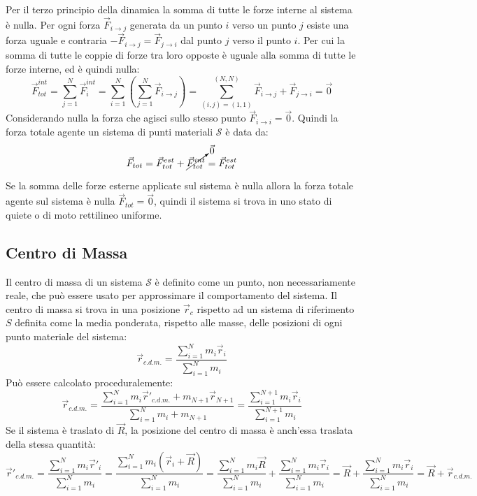 \documentclass{article}
\numberwithin{equation}{subsection}
\begin{document}
Per il terzo principio della dinamica 
la somma di tutte le forze interne al sistema è nulla. Per ogni 
forza $\vec{F}_{i\to j}$ generata da un punto $i$ verso un punto $j$ 
esiste una forza uguale e contraria $-\vec{F}_{i\to j}=\vec{F}_{j\to i}$ dal punto $j$ verso il punto $i$. 
Per cui la somma di tutte le coppie di forze tra loro opposte 
è uguale alla somma di tutte le forze interne, ed è quindi nulla:
\begin{equation}
    \vec{F}_{tot}^{int}=\displaystyle\sum_{j=1}^{N}\vec{F}_i^{int}=\sum_{i=1}^{N}\left(\sum_{j=1}^{N}\vec{F}_{i\to j}\right)=\sum_{(i,j)=(1,1)}^{(N,N)}\vec{F}_{i\to j}+\vec{F}_{j\to i}=\vec{0}
\end{equation}
Considerando nulla la forza che agisci sullo stesso punto $\vec{F}_{i\to i}=\vec{0}$.
Quindi la forza totale agente un sistema di punti materiali $\mathscr{S}$ è data da:
\begin{equation}
    \vec{F}_{tot}=\vec{F}^{est}_{tot}+\cancelto{\vec0}{\vec{F}^{int}_{tot}}=\vec{F}^{est}_{tot}
\end{equation}


Se la somma delle forze esterne applicate sul sistema 
è nulla allora la forza totale agente sul sistema è nulla $\vec{F}_{tot}=\vec{0}$, quindi il sistema 
si trova in uno stato di quiete o di moto rettilineo uniforme. 

\subsection{Centro di Massa}
Il centro di massa di un sistema $\mathscr{S}$ è definito come 
un punto, non necessariamente reale, che può essere usato per approssimare il comportamento del sistema. 
Il centro di massa si trova in una posizione $\vec{r}_c$ 
rispetto ad un sistema di riferimento $S$ definita come la media ponderata, rispetto alle masse, delle posizioni di ogni punto materiale del sistema: 
\begin{equation}
    \vec{r}_{c.d.m.}=\displaystyle\frac{\sum_{i=1}^{N}m_i\vec{r}_i}{\sum_{i=1}^{N}m_i}
\end{equation}
Può essere calcolato proceduralemente:
\begin{equation*}
    \vec{r}_{c.d.m.}=\displaystyle\frac{\sum_{i=1}^Nm_i\vec{r}'_{c.d.m.}+m_{N+1}\vec{r}_{N+1}}{\sum_{i=1}^Nm_i+m_{N+1}}=\frac{\sum_{i=1}^{N+1}m_i\vec{r}_i}{\sum_{i=1}^{N+1}m_i}
\end{equation*}
Se il sistema è traslato di $\vec{R}$, la posizione del 
centro di massa è anch'essa traslata della stessa quantità:
\begin{equation*}
    \vec{r}'_{c.d.m.}=\displaystyle\frac{\sum_{i=1}^{N}m_i\vec{r}'_i}{\sum_{i=1}^{N}m_i}=\displaystyle\frac{\sum_{i=1}^{N}m_i(\vec{r}_i+\vec{R})}{\sum_{i=1}^{N}m_i}=\displaystyle\frac{\sum_{i=1}^{N}m_i\vec{R}}{\sum_{i=1}^{N}m_i}+\displaystyle\frac{\sum_{i=1}^{N}m_i\vec{r}_i}{\sum_{i=1}^{N}m_i}=\vec{R}+\displaystyle\frac{\sum_{i=1}^{N}m_i\vec{r}_i}{\sum_{i=1}^{N}m_i}=\vec{R}+\vec{r}_{c.d.m.}
\end{equation*}
\end{document}
